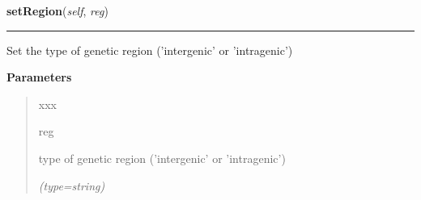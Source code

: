     \label{script-FixedVar:var:setRegion}

    \vspace{0.5ex}

\hspace{.8\funcindent}\begin{boxedminipage}{\funcwidth}

    \raggedright \textbf{setRegion}(\textit{self}, \textit{reg})

    \vspace{-1.5ex}

    \rule{\textwidth}{0.5\fboxrule}
\setlength{\parskip}{2ex}
    Set the type of genetic region ('intergenic' or 'intragenic')

\setlength{\parskip}{1ex}
      \textbf{Parameters}
      \vspace{-1ex}

      \begin{quote}
        \begin{Ventry}{xxx}

          \item[reg]

          type of genetic region ('intergenic' or 'intragenic')

            {\it (type=string)}

        \end{Ventry}

      \end{quote}

    \end{boxedminipage}

    \label{script-FixedVar:var:setImpact}

    \vspace{0.5ex}


